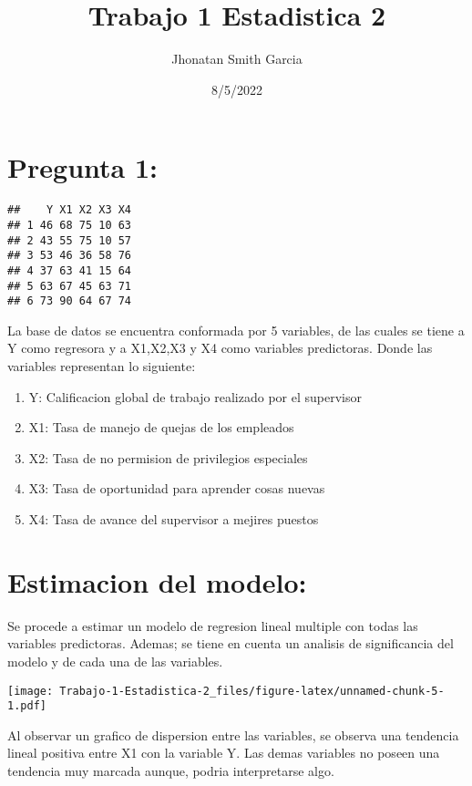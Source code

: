 \documentclass[
]{article}
\title{Trabajo 1 Estadistica 2}
\author{Jhonatan Smith Garcia}
\date{8/5/2022}
\begin{document}
\maketitle

\hypertarget{pregunta-1}{%
\section{Pregunta 1:}\label{pregunta-1}}

\begin{verbatim}
##    Y X1 X2 X3 X4
## 1 46 68 75 10 63
## 2 43 55 75 10 57
## 3 53 46 36 58 76
## 4 37 63 41 15 64
## 5 63 67 45 63 71
## 6 73 90 64 67 74
\end{verbatim}

La base de datos se encuentra conformada por 5 variables, de las cuales
se tiene a Y como regresora y a X1,X2,X3 y X4 como variables
predictoras. Donde las variables representan lo siguiente:

\begin{enumerate}
\def\labelenumi{\arabic{enumi})}
\item
  Y: Calificacion global de trabajo realizado por el supervisor
\item
  X1: Tasa de manejo de quejas de los empleados
\item
  X2: Tasa de no permision de privilegios especiales
\item
  X3: Tasa de oportunidad para aprender cosas nuevas
\item
  X4: Tasa de avance del supervisor a mejires puestos
\end{enumerate}

\hypertarget{estimacion-del-modelo}{%
\section{Estimacion del modelo:}\label{estimacion-del-modelo}}

Se procede a estimar un modelo de regresion lineal multiple con todas
las variables predictoras. Ademas; se tiene en cuenta un analisis de
significancia del modelo y de cada una de las variables.

\texttt{[image: Trabajo-1-Estadistica-2\_files/figure-latex/unnamed-chunk-5-1.pdf]}

Al observar un grafico de dispersion entre las variables, se observa una
tendencia lineal positiva entre X1 con la variable Y. Las demas
variables no poseen una tendencia muy marcada aunque, podria
interpretarse algo.
\end{document}
